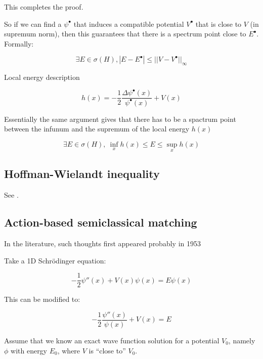 \documentclass{article}
\theoremstyle{definition}
\begin{document}
This completes the proof.

So if we can find a $\psi^\bullet$ that induces a compatible potential $V^\bullet$ that is close to $V$ (in supremum norm), then this guarantees that there is a spectrum point close to $E^\bullet$. Formally:

\begin{equation}
    \exists E \in \sigma(H), |E-E^\bullet| \le ||V-V^\bullet||_\infty
\end{equation}

Local energy description

\begin{equation}
    h(x) = -\frac{1}{2} \frac{\Delta \psi^\bullet(x)}{\psi^\bullet(x)} + V(x)
\end{equation}

Essentially the same argument gives that there has to be a spactrum point between the infunum and the supremum of the local energy $h(x)$

\begin{equation}
    \exists E \in \sigma(H), \ 
    \inf_{x} h(x) \le E \le \sup_{x} h(x)
\end{equation}

\subsection{Hoffman-Wielandt inequality}

See \cite{paper:BhatiaElsner1994}.

\subsection{Action-based semiclassical matching}

In the literature, such thoughts first appeared probably in 1953 \cite{paper:GoodMiller1953}

Take a 1D Schrödinger equation:

\begin{equation}
    -\frac{1}{2} \psi''(x) + V(x) \psi(x) = E \psi(x)
\end{equation}

This can be modified to:

\begin{equation}
    -\frac{1}{2} \frac{\psi''(x)}{\psi(x)} + V(x) = E
\end{equation}

Assume that we know an exact wave function solution for a potential $V_0$, namely $\phi$ with energy $E_0$, where $V$ is ``close to'' $V_0$.
\end{document}
